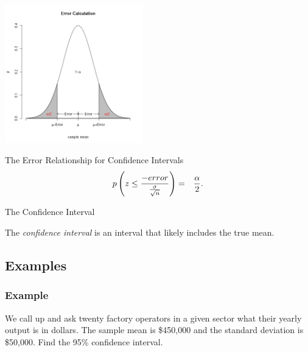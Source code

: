 \begin{frame}

  \centerline{\includegraphics[width=6cm]{img/confidenceInterval}}

  \begin{block}{The Error Relationship for Confidence Intervals}
    \begin{eqnarray*}
      p\left( z \leq \frac{-error}{\frac{\sigma}{\sqrt{n}}}\right) & = & \frac{\alpha}{2}.
    \end{eqnarray*}
  \end{block}

\end{frame}


\begin{frame}{The Confidence Interval}
  \begin{definition}
    The \textit{confidence interval} is an interval that likely
    includes the true mean.
  \end{definition}
\end{frame}

\subsection{Examples}


\begin{frame}
  \frametitle{Example}

  We call up and ask twenty factory operators in a given sector what
  their yearly output is in dollars. The sample mean is \$450,000 and
  the standard deviation is \$50,000. Find the 95\% confidence
  interval.

  \vfill


  \vfill

\end{frame}


